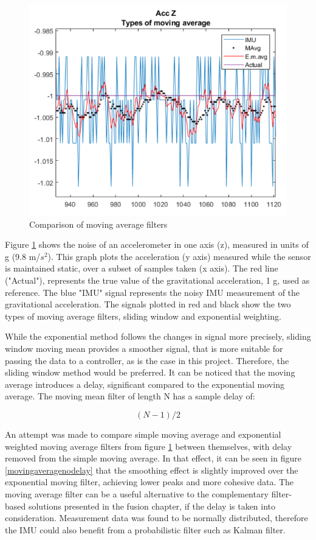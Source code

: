 \begin{figure}[H]
  \centering
  \includegraphics[scale=0.7]{graphics/accZ.png}
  \caption{Comparison of moving average filters}
  \label{movingaverage}
\end{figure}

Figure \ref{movingaverage} shows the noise of an accelerometer in one axis (z), measured in units of g (9.8 m/$s^2$). This graph plots the acceleration (y axis) measured while the sensor is maintained static, over a subset of samples taken (x axis).
The red line ("Actual"), represents the true value of the gravitational acceleration, 1 g, used as reference. The blue "IMU" signal represents the noisy IMU measurement of the gravitational acceleration. The signals plotted in red and black show the two types of moving average filters, sliding window and exponential weighting.

While the exponential method follows the changes in signal more precisely, sliding window moving mean provides a smoother signal, that is more suitable for passing the data to a controller, as is the case in this project. Therefore, the sliding window method would be preferred. 
It can be noticed that the moving average introduces a delay, significant compared to the exponential moving average. The moving mean filter of length N has a sample delay of:

\begin{equation}\label{delay}
	(N-1)/2
\end{equation}

An attempt was made to compare simple moving average and exponential weighted moving average filters from figure \ref{movingaverage} between themselves, with delay removed from the simple moving average. In that effect, it can be seen in figure \ref{movingaveragenodelay} that the smoothing effect is slightly improved over the exponential moving filter, achieving lower peaks and more cohesive data. The moving average filter can be a useful alternative to the complementary filter-based solutions presented in the fusion chapter, if the delay is taken into consideration. Measurement data was found to be normally distributed, therefore the IMU could also benefit from a probabilistic filter such as Kalman filter. 

